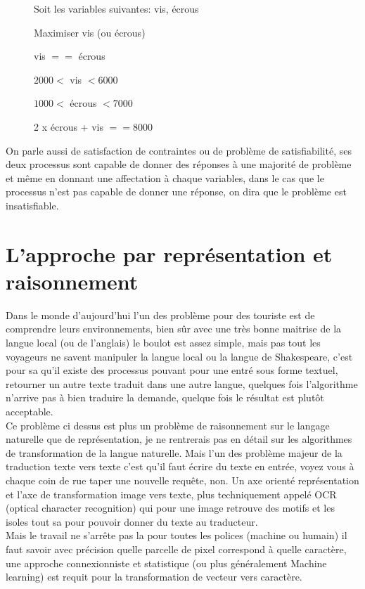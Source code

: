 \begin{description}
\item[] Soit les variables suivantes: vis, écrous
\item[] Maximiser vis (ou écrous)
\item[] vis $==$ écrous
\item[] $2000 <$ vis $< 6000$
\item[] $1000 <$ écrous $< 7000$
\item[] 2 x écrous + vis $== 8000$
\end{description}

On parle aussi de satisfaction de contraintes ou de problème de satisfiabilité, ses deux processus sont capable de donner des réponses à une majorité de problème et même en donnant une affectation à chaque variables, dans le cas que le processus n'est pas capable de donner une réponse, on dira que le problème est insatisfiable.

\pagebreak

\section{L'approche par représentation et raisonnement}

Dans le monde d'aujourd'hui l'un des problème pour des touriste est de comprendre leurs environnements, bien sûr avec une très bonne maitrise de la langue local (ou de l'anglais) le boulot est assez simple, mais pas tout les voyageurs ne savent manipuler la langue local ou la langue de Shakespeare, c'est pour sa qu'il existe des processus pouvant pour une entré sous forme textuel, retourner un autre texte traduit dans une autre langue, quelques fois l'algorithme n'arrive pas à bien traduire la demande, quelque fois le résultat est plutôt acceptable.\\
Ce problème ci dessus est plus un problème de raisonnement sur le langage naturelle que de représentation, je ne rentrerais pas en détail sur les algorithmes de transformation de la langue naturelle. Mais l'un des problème majeur de la traduction texte vers texte c'est qu'il faut écrire du texte en entrée, voyez vous à chaque coin de rue taper une nouvelle requête, non. Un axe orienté représentation et l'axe de transformation image vers texte, plus techniquement appelé OCR (optical character recognition) qui pour une image retrouve des motifs et les isoles tout sa pour pouvoir donner du texte au traducteur.\\
Mais le travail ne s'arrête pas la  pour toutes les polices (machine ou humain) il faut savoir avec précision quelle parcelle de pixel correspond à quelle caractère, une approche connexionniste et statistique (ou plus généralement Machine learning) est requit pour la transformation de vecteur vers caractère.

\pagebreak
